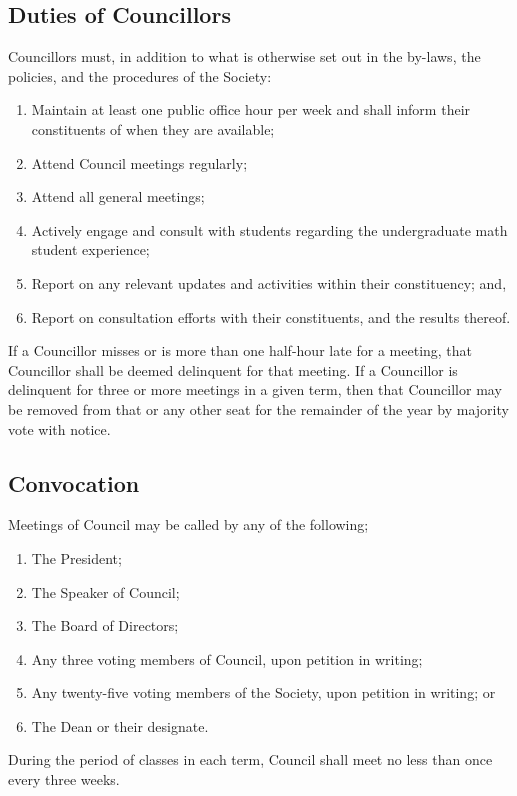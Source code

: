 \subsection{Duties of Councillors}

Councillors must, in addition to what is otherwise set out in the by-laws,
the policies, and the procedures of the Society:
\begin{enumerate}
    \item Maintain at least one public office hour per week and shall inform
        their constituents of when they are available; 
    \item Attend Council meetings regularly; 
    \item Attend all general meetings;
    \item Actively engage and consult with students regarding the undergraduate
        math student experience;
    \item Report on any relevant updates and activities within their
        constituency; and,
    \item Report on consultation efforts with their constituents, and the
        results thereof.
\end{enumerate}

If a Councillor misses or is more than one half-hour late for a meeting, that
Councillor shall be deemed delinquent for that meeting. If a Councillor is
delinquent for three or more meetings in a given term, then that Councillor may
be removed from that or any other seat for the remainder of the year by
majority vote with notice.

\subsection{Convocation}
Meetings of Council may be called by any of the following;
\begin{enumerate}
  \item The President;
  \item The Speaker of Council;
  \item The Board of Directors;
  \item Any three voting members of Council, upon petition in writing;
  \item Any twenty-five voting members of the Society, upon petition in writing;
    or
  \item The Dean or their designate.
\end{enumerate}

During the period of classes in each term, Council shall meet no less
than once every three weeks.

